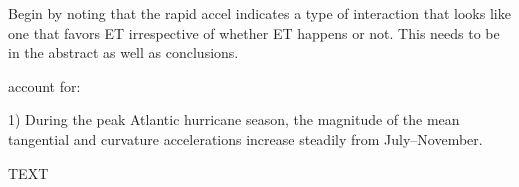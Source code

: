 \documentclass[wcd,manuscript]{copernicus}
\begin{document}
Begin by noting that the rapid accel indicates a type of interaction that looks like one that favors ET irrespective of whether ET happens or not. This needs to be in the abstract as well as conclusions.

account for:

1) During the peak Atlantic hurricane season, the magnitude of the mean tangential and curvature accelerations increase steadily from July--November. 


\conclusions  %
TEXT











\appendix
\section{}    %





\noappendix       %


\end{document}
